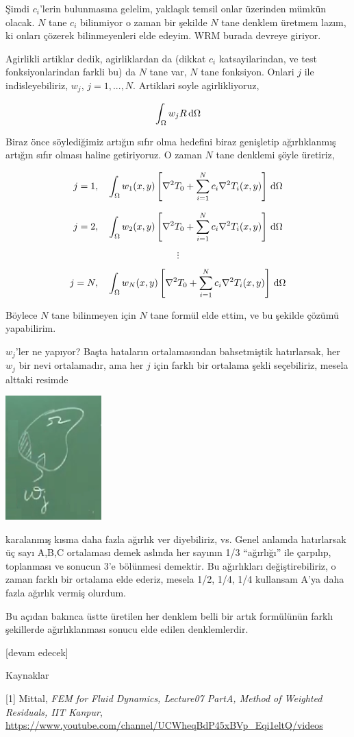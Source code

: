 \documentclass[12pt,fleqn]{article}\usepackage{../../common}
\begin{document}
Şimdi $c_i$'lerin bulunmasına gelelim, yaklaşık temsil onlar üzerinden mümkün
olacak. $N$ tane $c_i$ bilinmiyor o zaman bir şekilde $N$ tane denklem üretmem
lazım, ki onları çözerek bilinmeyenleri elde edeyim. WRM burada devreye giriyor.

Agirlikli artiklar dedik, agirliklardan da (dikkat $c_i$ katsayilarindan, ve
test fonksiyonlarindan farkli bu) da $N$ tane var, $N$ tane fonksiyon. Onlari
$j$ ile indisleyebiliriz, $w_j$, $j=1,...,N$. Artiklari soyle agirlikliyoruz,

$$
\int_\Omega w_j R \,\mathrm{d} \Omega
$$

Biraz önce söylediğimiz artığın sıfır olma hedefini biraz genişletip
ağırlıklanmış artığın sıfır olması haline getiriyoruz. O zaman $N$ tane denklemi
şöyle üretiriz,

$$
j=1,\quad
\int_\Omega w_1 (x,y) \left[
  \nabla^2 T_0 + \sum _{i=1}^{N} c_i \nabla^2 T_i(x,y) 
  \right] \,\mathrm{d} \Omega
$$

$$
j=2,\quad
\int_\Omega w_2 (x,y) \left[
  \nabla^2 T_0 + \sum _{i=1}^{N} c_i \nabla^2 T_i(x,y) 
  \right] \,\mathrm{d} \Omega
$$

$$
\vdots
$$

$$
j=N,\quad
\int_\Omega w_N (x,y) \left[
  \nabla^2 T_0 + \sum _{i=1}^{N} c_i \nabla^2 T_i(x,y) 
  \right] \,\mathrm{d} \Omega
$$

Böylece $N$ tane bilinmeyen için $N$ tane formül elde ettim, ve bu şekilde
çözümü yapabilirim.

$w_j$'ler ne yapıyor? Başta hataların ortalamasından bahsetmiştik hatırlarsak,
her $w_j$ bir nevi ortalamadır, ama her $j$ için farklı bir ortalama şekli
seçebiliriz, mesela alttaki resimde

\includegraphics[width=10em]{compscieng_app45aerofem1_02.png}

karalanmış kısma daha fazla ağırlık ver diyebiliriz, vs. Genel anlamda
hatırlarsak üç sayı A,B,C ortalaması demek aslında her sayının 1/3 ``ağırlığı''
ile çarpılıp, toplanması ve sonucun 3'e bölünmesi demektir. Bu ağırlıkları
değiştirebiliriz, o zaman farklı bir ortalama elde ederiz, mesela 1/2, 1/4, 1/4
kullansam A'ya daha fazla ağırlık vermiş olurdum.

Bu açıdan bakınca üstte üretilen her denklem belli bir artık formülünün
farklı şekillerde ağırlıklanması sonucu elde edilen denklemlerdir.

[devam edecek]

Kaynaklar

[1] Mittal, {\em FEM for Fluid Dynamics, Lecture07 PartA, Method of Weighted Residuals, IIT Kanpur},
    \url{https://www.youtube.com/channel/UCWheqBdP45xBVp_Eqi1eltQ/videos}
\end{document}

